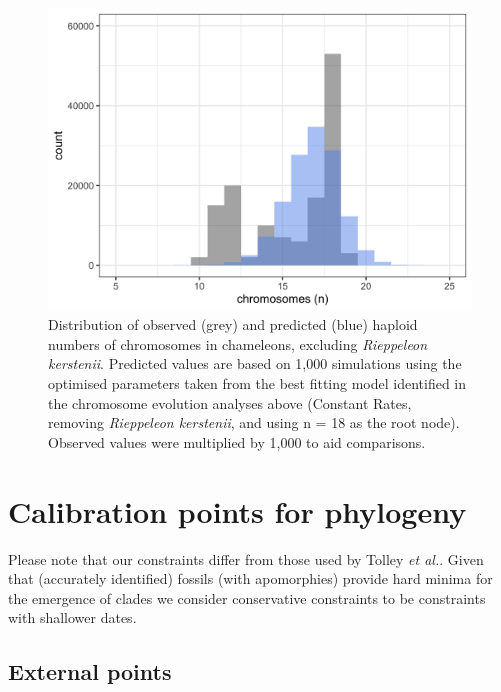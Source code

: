 \documentclass[a4paper, 12pt]{article}
\begin{document}
\newpage
\begin{figure}[H]
 \centering
  \includegraphics[width = \linewidth]{figures/chromevol-simulations-numbers.png}
  \caption{Distribution of observed (grey) and predicted (blue) haploid numbers of chromosomes in chameleons, excluding \textit{Rieppeleon kerstenii}. Predicted values are based on 1,000 simulations using the optimised parameters taken from the best fitting model identified in the chromosome evolution analyses above (Constant Rates, removing \textit{Rieppeleon kerstenii}, and using n = 18 as the root node). Observed values were multiplied by 1,000 to aid comparisons.
}
  \label{fig-otus-predicted}
\end{figure} 

\newpage
\section{Calibration points for phylogeny}

Please note that our constraints differ from those used by Tolley \textit{et al.}\cite{tolley2013large}. Given that (accurately identified) fossils (with apomorphies) provide hard minima for the emergence of clades we consider conservative constraints to be constraints with shallower dates.
 
\subsection{External points}
 
\end{document}

